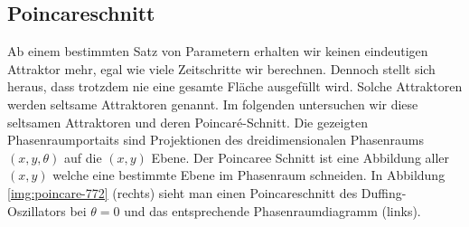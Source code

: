 \documentclass{scrartcl}
\begin{document}
\subsection{ Poincareschnitt }
Ab einem bestimmten Satz von Parametern erhalten wir keinen eindeutigen Attraktor mehr, egal wie viele Zeitschritte wir berechnen. Dennoch stellt sich heraus, dass trotzdem nie eine gesamte Fläche ausgefüllt wird. Solche Attraktoren werden seltsame Attraktoren genannt. Im folgenden untersuchen wir diese seltsamen Attraktoren und deren Poincaré-Schnitt. 
Die gezeigten Phasenraumportaits sind Projektionen des dreidimensionalen Phasenraums $(x,y,\theta)$ auf die $(x,y)$ Ebene. Der Poincaree Schnitt ist eine Abbildung aller $(x,y)$ welche eine bestimmte Ebene im Phasenraum schneiden. In Abbildung \ref{img:poincare-772} (rechts) sieht man einen Poincareschnitt des Duffing-Oszillators bei $\theta=0$ und das entsprechende Phasenraumdiagramm (links).
\end{document}
